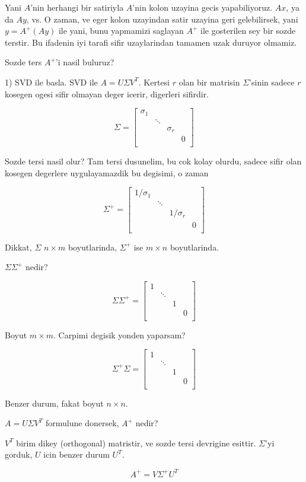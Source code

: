 \documentclass[12pt,fleqn]{article}\usepackage{../common}
\begin{document}
Yani $A$'nin herhangi bir satiriyla $A$'nin kolon uzayina gecis
yapabiliyoruz. $Ax$, ya da $Ay$, vs. O zaman, ve eger kolon uzayindan satir
uzayina geri gelebilirsek, yani $y = A^{+}(Ay)$ ile yani, bunu yapmamizi
saglayan $A^{+}$ ile gosterilen sey bir sozde terstir. Bu ifadenin iyi
tarafi sifir uzaylarindan tamamen uzak duruyor olmamiz. 

Sozde ters $A^{+}$'i nasil buluruz? 

1) SVD ile basla. SVD ile $A = U \Sigma V^T$. Kertesi $r$ olan bir matrisin
$\Sigma$'sinin sadece $r$ kosegen ogesi sifir olmayan deger icerir,
digerleri sifirdir. 

$$ 
\Sigma = 
\left[\begin{array}{cccc}
\sigma_1 & & & \\
 & \ddots & & \\
 &  & \sigma_r & \\
 &  &  & 0 \\
\end{array}\right]
 $$

Sozde tersi nasil olur? Tam tersi dusunelim, bu cok kolay olurdu, sadece
sifir olan kosegen degerlere uygulayamazdik bu degisimi, o zaman

$$ 
\Sigma^{+} = 
\left[\begin{array}{cccc}
1/\sigma_1 & & & \\
 & \ddots & & \\
 &  & 1/\sigma_r & \\
 &  &  & 0 \\
\end{array}\right]
 $$

Dikkat, $\Sigma$ $n \times m$ boyutlarinda, $\Sigma^{+}$ ise $m \times n$
boyutlarinda. 

$\Sigma \Sigma^{+}$ nedir? 


$$ \Sigma \Sigma^{+} =  
\left[\begin{array}{cccc}
1 & & & \\
 & \ddots & & \\
 &  & 1 & \\
 &  &  & 0 \\
\end{array}\right]
$$

Boyut $m \times m$. Carpimi degisik yonden yaparsam? 

$$ \Sigma^{+}\Sigma  =  
\left[\begin{array}{cccc}
1 & & & \\
 & \ddots & & \\
 &  & 1 & \\
 &  &  & 0 \\
\end{array}\right]
$$

Benzer durum, fakat boyut $n \times n$. 

$A = U \Sigma V^T$ formulune donersek, $A^{+}$ nedir? 

$V^{T}$ birim dikey (orthogonal) matristir, ve sozde tersi devrigine
esittir. $\Sigma$'yi gorduk, $U$ icin benzer durum $U^T$. 

$$ A^{+} =  V \Sigma^{+} U^T$$
\end{document}
